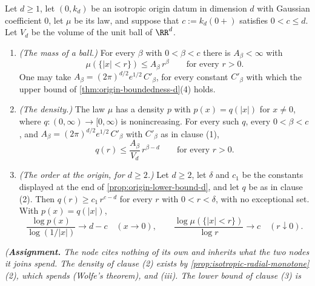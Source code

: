 \begin{proposition}
\label{prop:origin-upper-bound-d}
\leanok
Let $d \ge 1$, let $(0, k_d)$ be an isotropic origin datum in dimension $d$ with Gaussian
coefficient $0$, let $\mu$ be its law, and suppose that $c := k_d(0{+})$ satisfies $0 < c \le d$.
Let $V_d$ be the volume of the unit ball of $\RR^d$.
\begin{enumerate}
\item \emph{(The mass of a ball.)} For every $\beta$ with $0 < \beta < c$ there is
$A_\beta < \infty$ with
\[
  \mu(\{|x| < r\}) \le A_\beta\,r^{\beta} \qquad\text{for every } r > 0 .
\]
One may take $A_\beta = (2\pi)^{d/2}e^{1/2}\,C'_\beta$, for every constant $C'_\beta$ with which
the upper bound of \ref{thm:origin-boundedness-d}(4) holds.
\item \emph{(The density.)} The law $\mu$ has a density $p$ with $p(x) = q(|x|)$ for $x \ne 0$,
where $q : (0,\infty) \to [0,\infty)$ is nonincreasing. For every such $q$, every $0 < \beta < c$, and
$A_\beta = (2\pi)^{d/2}e^{1/2}\,C'_\beta$ with $C'_\beta$ as in clause (1),
\[
  q(r) \le \frac{A_\beta}{V_d}\,r^{\beta-d} \qquad\text{for every } r > 0 .
\]
\item \emph{(The order at the origin, for $d \ge 2$.)} Let $d \ge 2$, let $\delta$ and $c_1$ be
the constants displayed at the end of \ref{prop:origin-lower-bound-d}, and let $q$ be as in
clause (2). Then
$q(r) \ge c_1\,r^{c-d}$ for every $r$ with $0 < r < \delta$, with no exceptional set. With
$p(x) = q(|x|)$,
\[
  \frac{\log p(x)}{\log(1/|x|)} \to d - c \quad (x \to 0), \qquad
  \frac{\log \mu(\{|x| < r\})}{\log r} \to c \quad (r \downarrow 0) .
\]
\end{enumerate}
\statusA\quad{}\quad{}\quad{}\quad\emph{(\textbf{Assignment.} The node
cites nothing of its own and inherits what the two nodes it joins spend. The density of clause (2)
exists by \ref{prop:isotropic-radial-monotone}(2), which spends  (Wolfe's theorem),
 and (iii). The lower bound of clause (3) is
}
\end{proposition}
